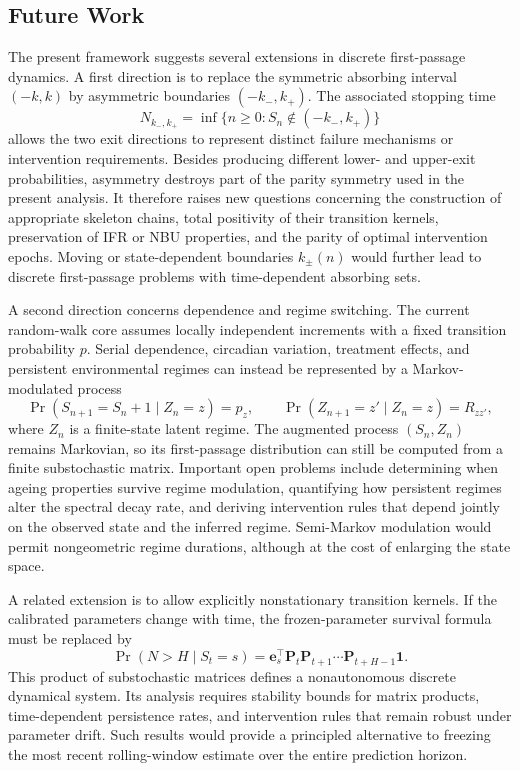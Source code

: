 \documentclass[pdflatex,sn-mathphys-num]{sn-jnl}
\theoremstyle{definition}
\numberwithin{equation}{section}
\begin{document}
\subsection*{Future Work}

The present framework suggests several extensions in discrete first-passage
dynamics. A first direction is to replace the symmetric absorbing interval
\((-k,k)\) by asymmetric boundaries \((-k_-,k_+)\). The associated stopping
time
\[
N_{k_-,k_+}
=
\inf\{n\geq 0:S_n\notin(-k_-,k_+)\}
\]
allows the two exit directions to represent distinct failure mechanisms or
intervention requirements. Besides producing different lower- and upper-exit
probabilities, asymmetry destroys part of the parity symmetry used in the
present analysis. It therefore raises new questions concerning the
construction of appropriate skeleton chains, total positivity of their
transition kernels, preservation of IFR or NBU properties, and the parity of
optimal intervention epochs. Moving or state-dependent boundaries
\(k_\pm(n)\) would further lead to discrete first-passage problems with
time-dependent absorbing sets.

A second direction concerns dependence and regime switching. The current
random-walk core assumes locally independent increments with a fixed transition
probability \(p\). Serial dependence, circadian variation, treatment effects,
and persistent environmental regimes can instead be represented by a
Markov-modulated process
\[
\Pr(S_{n+1}=S_n+1\mid Z_n=z)=p_z,
\qquad
\Pr(Z_{n+1}=z'\mid Z_n=z)=R_{zz'},
\]
where \(Z_n\) is a finite-state latent regime. The augmented process
\((S_n,Z_n)\) remains Markovian, so its first-passage distribution can still be
computed from a finite substochastic matrix. Important open problems include
determining when ageing properties survive regime modulation, quantifying how
persistent regimes alter the spectral decay rate, and deriving intervention
rules that depend jointly on the observed state and the inferred regime.
Semi-Markov modulation would permit nongeometric regime durations, although at
the cost of enlarging the state space.

A related extension is to allow explicitly nonstationary transition kernels.
If the calibrated parameters change with time, the frozen-parameter survival
formula must be replaced by
\[
\Pr(N>H\mid S_t=s)
=
\mathbf e_s^\top
\mathbf P_t\mathbf P_{t+1}\cdots
\mathbf P_{t+H-1}\mathbf 1.
\]
This product of substochastic matrices defines a nonautonomous discrete
dynamical system. Its analysis requires stability bounds for matrix products,
time-dependent persistence rates, and intervention rules that remain robust
under parameter drift. Such results would provide a principled alternative to
freezing the most recent rolling-window estimate over the entire prediction
horizon.
\end{document}

